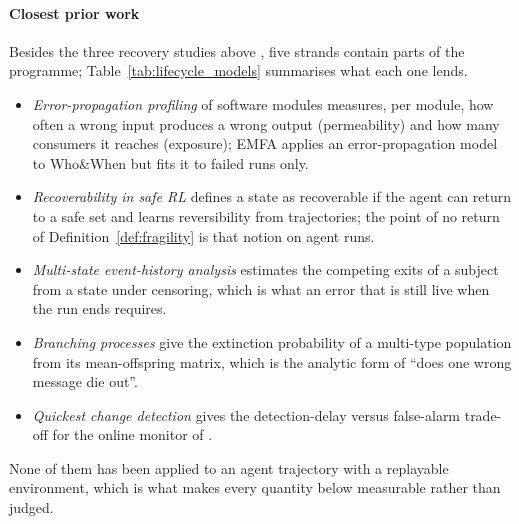 \documentclass[10pt,a4paper]{article}
\begin{document}
\paragraph{Closest prior work} Besides the three recovery studies above \cite{huang2024resilience,jamshidi2026cascade,zhu2026toolmaze}, five strands contain parts of the programme; Table~\ref{tab:lifecycle_models} summarises what each one lends.
\begin{itemize}[leftmargin=1.1em]
\item \emph{Error-propagation profiling} of software modules \cite{hiller2004epic} measures, per module, how often a wrong input produces a wrong output (permeability) and how many consumers it reaches (exposure); EMFA \cite{liao2026emfa} applies an error-propagation model to Who\&When but fits it to failed runs only.
\item \emph{Recoverability in safe RL} \cite{moldovan2012safe,grinsztajn2021reversibility} defines a state as recoverable if the agent can return to a safe set and learns reversibility from trajectories; the point of no return of Definition~\ref{def:fragility} is that notion on agent runs.
\item \emph{Multi-state event-history analysis} \cite{putter2007multistate,andersen1982cox,aalen1978empirical} estimates the competing exits of a subject from a state under censoring, which is what an error that is still live when the run ends requires.
\item \emph{Branching processes} \cite{harris1963branching} give the extinction probability of a multi-type population from its mean-offspring matrix, which is the analytic form of ``does one wrong message die out''.
\item \emph{Quickest change detection} \cite{page1954cusum,lorden1971,tartakovsky2014sequential} gives the detection-delay versus false-alarm trade-off for the online monitor of .
\end{itemize}
None of them has been applied to an agent trajectory with a replayable environment, which is what makes every quantity below measurable rather than judged.
\end{document}
